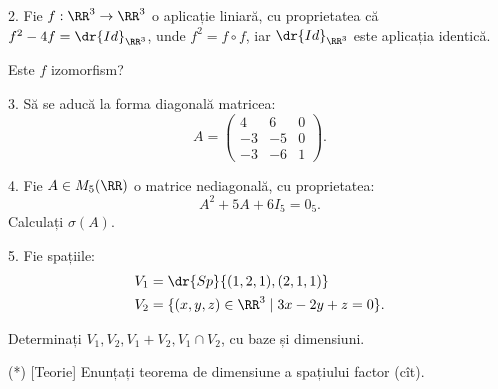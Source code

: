 \vspace{1cm}

2. Fie $ f : \RR^3 \to \RR^3 $ o aplicație liniară, cu proprietatea că
$ f^2 - 4f = \dr{Id}_{\RR^3} $, unde $ f^2 = f \circ f $, iar $ \dr{Id}_{\RR^3} $
este aplicația identică.

Este $ f $ izomorfism?

\vspace{1cm}

3. Să se aducă la forma diagonală matricea:
\[
  A = \begin{pmatrix}
    4 & 6 & 0 \\
    -3 & -5 & 0 \\
    -3 & -6 & 1
  \end{pmatrix}.
\]

\vspace{1cm}

4. Fie $ A \in M_5(\RR) $ o matrice nediagonală, cu proprietatea:
\[
  A^2 + 5A + 6I_5 = 0_5.
\]
Calculați $ \sigma(A) $.

\vspace{1cm}

5. Fie spațiile:
\begin{align*}
  V_1 &= \dr{Sp} \{ (1, 2, 1), (2, 1, 1) \} \\
  V_2 &= \{(x, y, z) \in \RR^3 \mid 3x - 2y + z = 0 \}.
\end{align*}

Determinați $ V_1, V_2, V_1 + V_2, V_1 \cap V_2 $, cu baze și dimensiuni.

\vspace{1cm}

(*) [Teorie] Enunțați teorema de dimensiune a spațiului factor (cît).



